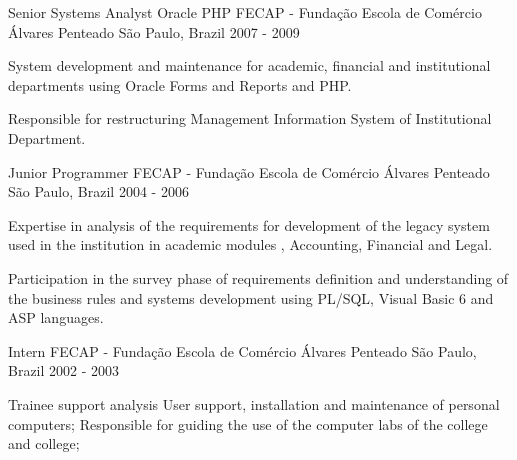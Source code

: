 \begin{cventries}
  \cventry
    {Senior Systems Analyst Oracle PHP} %
    {FECAP - Fundação Escola de Comércio Álvares Penteado} %
    {São Paulo, Brazil} %
    {2007 - 2009} %
    {
      \begin{cvitems} %
        \item {System development and maintenance for academic, financial and institutional departments using Oracle Forms and Reports and PHP.}
       \item{Responsible for restructuring Management Information System of Institutional Department.}
      \end{cvitems}
    }

  \cventry
    {Junior Programmer} %
    {FECAP - Fundação Escola de Comércio Álvares Penteado} %
    {São Paulo, Brazil} %
    {2004 - 2006} %
    {
      \begin{cvitems} %
        \item {Expertise in analysis of the requirements for development of the legacy system used in the institution in academic modules , Accounting, Financial and Legal.}
        \item {Participation in the survey phase of requirements definition and understanding of the business rules and systems development using PL/SQL, Visual Basic 6 and ASP languages.}
      \end{cvitems}
    }

  \cventry
    {Intern} %
    {FECAP - Fundação Escola de Comércio Álvares Penteado} %
    {São Paulo, Brazil} %
    {2002 - 2003} %
    {
      \begin{cvitems} %
        \item {Trainee support analysis
User support, installation and maintenance of personal computers;
Responsible for guiding the use of the computer labs of the college and college;}
      \end{cvitems}
    }

\end{cventries}
